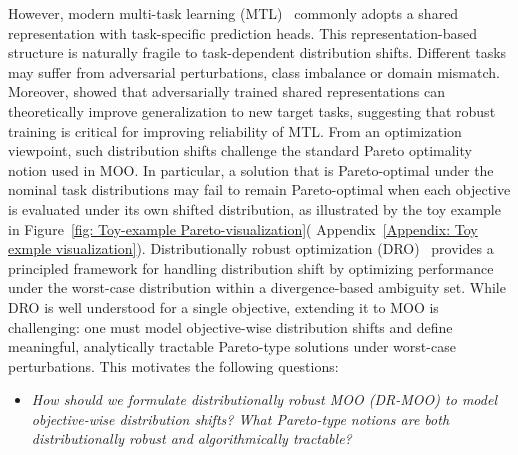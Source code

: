 \documentclass[twoside]{article} %
\theoremstyle{plain}
\theoremstyle{definition}
\theoremstyle{remark}
\begin{document}
However, modern multi-task learning (MTL)~\citep{MTL-DL-survey} commonly adopts a shared representation with task-specific prediction heads. This representation-based structure is naturally fragile to task-dependent distribution shifts. Different tasks may suffer from adversarial perturbations, class imbalance or domain mismatch. Moreover, \citet{robustMTL5} showed that adversarially trained shared representations can theoretically improve generalization to new target tasks, suggesting that robust training is critical for improving reliability of MTL. From an optimization viewpoint, such distribution shifts challenge the standard Pareto optimality notion used in MOO.
In particular, a solution that is Pareto-optimal under the nominal task distributions may fail to remain Pareto-optimal when each objective is evaluated under its own shifted distribution, as illustrated by the toy example in Figure~\ref{fig: Toy-example Pareto-visualization}( Appendix~\ref{Appendix: Toy exmple visualization}). Distributionally robust optimization (DRO)~\citep{DRO1st,DRO2nd,DRO3rd} provides a principled framework for handling distribution shift by optimizing performance under the worst-case distribution within a divergence-based ambiguity set. While DRO is well understood for a single objective, extending it to MOO is challenging: one must model objective-wise distribution shifts and define meaningful, analytically tractable Pareto-type solutions under worst-case perturbations. This motivates the following questions:
\begin{itemize}[leftmargin = *, topsep = 0pt]
\item \textit{How should we formulate distributionally robust MOO (DR-MOO) to model objective-wise distribution shifts? What Pareto-type notions are both distributionally robust and algorithmically tractable?}
\end{itemize}
\end{document}
